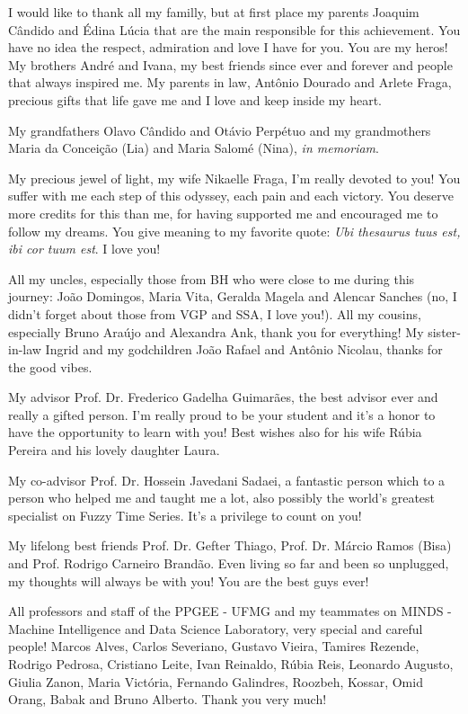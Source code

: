 \begin{agradecimentos}
I would like to thank all my familly, but at first place my parents Joaquim Cândido and Édina Lúcia that are the main responsible for this achievement.  You have no idea the respect, admiration and love I have for you. You are my heros! My brothers André and Ivana, my best friends since ever and forever and people that always inspired me. My parents in law, Antônio Dourado and Arlete Fraga, precious gifts that life gave me and I love and keep inside my heart. 

My grandfathers Olavo Cândido and Otávio Perpétuo and my grandmothers Maria da Conceição (Lia) and Maria Salomé (Nina), \textit{in memoriam}.

My precious jewel of light, my wife Nikaelle Fraga, I'm really devoted to you! You suffer with me each step of this odyssey, each pain and each victory. You deserve more credits for this than me, for having supported me and encouraged me to follow my dreams. You give meaning to my favorite quote: \textit{Ubi thesaurus tuus est, ibi cor tuum est}. I love you!

 All my uncles, especially those from BH who were close to me during this journey: João Domingos, Maria Vita, Geralda Magela and Alencar Sanches (no, I didn't forget about those from VGP and SSA, I love you!). All my cousins, especially Bruno Araújo and Alexandra Ank, thank you for everything! My sister-in-law Ingrid and my godchildren João Rafael and Antônio Nicolau, thanks for the good vibes. 

My advisor Prof. Dr. Frederico Gadelha Guimarães, the best advisor ever and really a gifted person. I'm really proud to be your student and it's a honor to have the opportunity to learn with you! Best wishes also for his wife Rúbia Pereira and his lovely daughter Laura.

My co-advisor Prof. Dr. Hossein Javedani Sadaei, a fantastic person which to a person who helped me and taught me a lot, also possibly the world's greatest specialist on Fuzzy Time Series. It's a privilege to count on you!

My lifelong best friends Prof. Dr. Gefter Thiago, Prof. Dr. Márcio Ramos (Bisa) and Prof. Rodrigo Carneiro Brandão. Even living so far and been so unplugged, my thoughts will always be with you! You are the best guys ever! 

All professors and staff of the PPGEE - UFMG and my teammates on MINDS - Machine Intelligence and Data Science Laboratory, very special and careful people! Marcos Alves, Carlos Severiano, Gustavo Vieira, Tamires Rezende, Rodrigo Pedrosa, Cristiano Leite, Ivan Reinaldo, Rúbia Reis, Leonardo Augusto,  Giulia Zanon, Maria Victória, Fernando Galindres, Roozbeh, Kossar, Omid Orang, Babak and Bruno Alberto. Thank you very much!  


\end{agradecimentos}
